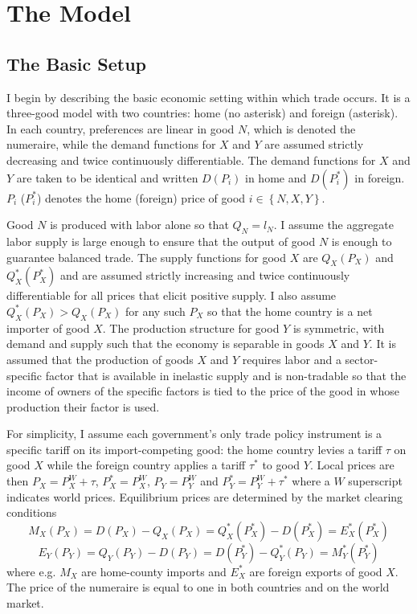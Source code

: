 \documentclass[10pt]{article}
\begin{document}
\section{The Model}
\label{sec:model}

\subsection{The Basic Setup}
\label{sec:basic}
I begin by describing the basic economic setting within which trade occurs. It is a three-good model with two countries: home (no asterisk) and foreign (asterisk). In each country, preferences are linear in good $N$, which is denoted the numeraire, while the demand functions for $X$ and $Y$ are assumed strictly decreasing and twice continuously differentiable. The demand functions for $X$ and $Y$ are taken to be identical and written $D(P_i)$ in home and $D(P_i^*)$ in foreign. $P_i$ ($P_i^*$) denotes the home (foreign) price of good $i \in \left\{N,X,Y\right\}$.

Good $N$ is produced with labor alone so that $Q_N = l_N$. I assume the aggregate labor supply is large enough to ensure that the output of good $N$ is enough to guarantee balanced trade. The supply functions for good $X$ are $Q_X(P_X)$ and $Q_X^*(P_X^*)$ and are assumed strictly increasing and twice continuously differentiable for all prices that elicit positive supply. I also assume $Q_X^*(P_X) > Q_X(P_X)$ for any such $P_X$ so that the home country is a net importer of good $X$. The production structure for good $Y$ is symmetric, with demand and supply such that the economy is separable in goods $X$ and $Y$. It is assumed that the production of goods $X$ and $Y$ requires labor and a sector-specific factor that is available in inelastic supply and is non-tradable so that the income of owners of the specific factors is tied to the price of the good in whose production their factor is used. 

For simplicity, I assume each government's only trade policy instrument is a specific tariff on its import-competing good: the home country levies a tariff $\tau$ on good $X$ while the foreign country applies a tariff $\tau^*$ to good $Y$. Local prices are then $P_X = P_X^W + \tau$, $P_X^* = P_X^W$, $P_Y = P_Y^W$ and $P_Y^* = P_Y^W + \tau^*$ where a $W$ superscript indicates world prices. Equilibrium prices are determined by the market clearing conditions
$$M_X(P_X)= D(P_X)-Q_X(P_X) = Q_X^*(P_X^*) - D(P_X^*) = E_X^*(P_X^*)$$
$$E_Y(P_Y)=Q_Y(P_Y)-D(P_Y) = D(P_Y^*)-Q_Y^*(P_Y) = M_Y^*(P_Y^*)$$
where e.g. $M_X$ are home-county imports and $E_X^*$ are foreign exports of good $X$. The price of the numeraire is equal to one in both countries and on the world market.
\end{document}
